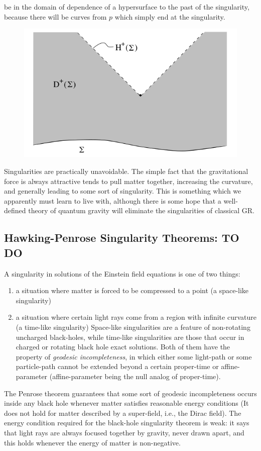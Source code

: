  be in the domain of dependence of a hypersurface to the past of the singularity, because
 there will be curves from $p$ which simply end at the singularity.
 \begin{figure}[h!]
 	\centering
 	\includegraphics[width=0.7\linewidth]{gfx/SingularitiesGR}
 	\caption{}
 	\label{fig:singularitiesgr}
 \end{figure}
 Singularities are practically unavoidable. The simple fact that the gravitational force is always attractive
 tends to pull matter together, increasing the curvature, and generally leading to some sort of
 singularity. This is something which we apparently must learn to live with, although there
 is some hope that a well-defined theory of quantum gravity will eliminate the singularities
 of classical GR.
 
 
 
 
 
 
 
 
 
 
 \subsection{Hawking-Penrose Singularity Theorems: TO DO}
 \label{subsec:HawkingPenroseSingularity}
 A singularity in solutions of the Einstein field equations is one of two things:\\
 \begin{enumerate}
 	\item
 	a situation where matter is forced to be compressed to a point (a space-like singularity)
 	\item a situation where certain light rays come from a region with infinite curvature (a time-like singularity)
 	Space-like singularities are a feature of non-rotating uncharged black-holes, while time-like singularities are those that occur in charged or rotating black hole exact solutions. Both of them have the property of \emph{geodesic incompleteness}, in which either some light-path or some particle-path cannot be extended beyond a certain proper-time or affine-parameter (affine-parameter being the null analog of proper-time).
 \end{enumerate}
 The Penrose theorem guarantees that some sort of geodesic incompleteness occurs inside any black hole whenever matter satisfies reasonable energy conditions (It does not hold for matter described by a super-field, i.e., the Dirac field). The energy condition required for the black-hole singularity theorem is weak: it says that light rays are always focused together by gravity, never drawn apart, and this holds whenever the energy of matter is non-negative.\\
 \\
 
